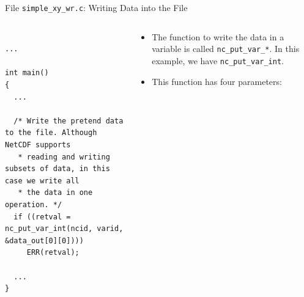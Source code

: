 \documentclass[compress,11pt,xcolor=svgnames,aspectratio=169]{beamer}
\begin{document}
\begin{frame}[fragile]{File \texttt{simple\_xy\_wr.c}: Writing Data into the File}

\begin{columns}

\begin{column}{0.5\textwidth}

{\tiny

\begin{verbatim}

...

int main()
{
  ...

  /* Write the pretend data to the file. Although NetCDF supports
   * reading and writing subsets of data, in this case we write all
   * the data in one operation. */
  if ((retval = nc_put_var_int(ncid, varid, &data_out[0][0])))
     ERR(retval);

  ...
}

\end{verbatim}

}

\end{column}

\begin{column}{0.5\textwidth}

{\footnotesize

\begin{itemize}
\setlength\itemsep{0.5cm}

\item The function to write the data in a variable is called \verb|nc_put_var_*|. In this example, we have \verb|nc_put_var_int|.

\item This function has four parameters:



\end{itemize}

}

\end{column}

\end{columns}

\end{frame}
\end{document}
